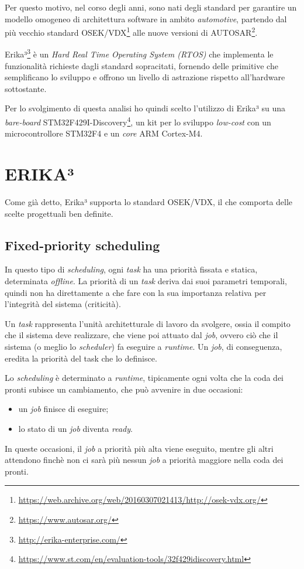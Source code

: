 \documentclass{article}
\begin{document}
Per questo motivo, nel corso degli anni, sono nati degli standard per garantire un modello omogeneo di architettura software in ambito \textit{automotive}, partendo dal più vecchio standard OSEK/VDX\footnote{\url{https://web.archive.org/web/20160307021413/http://osek-vdx.org/}} alle nuove versioni di AUTOSAR\footnote{\url{https://www.autosar.org/}}.

Erika³\footnote{\url{http://erika-enterprise.com/}} è un \textit{Hard Real Time Operating System (RTOS)} che implementa le funzionalità richieste dagli standard sopracitati, fornendo delle primitive che semplificano lo sviluppo e offrono un livello di astrazione rispetto all'hardware sottostante.

Per lo svolgimento di questa analisi ho quindi scelto l'utilizzo di Erika³ su una \textit{bare-board} STM32F429I-Discovery\footnote{\url{https://www.st.com/en/evaluation-tools/32f429idiscovery.html}}, un kit per lo sviluppo \textit{low-cost} con un microcontrollore STM32F4 e un \textit{core} ARM Cortex-M4.

\section{ERIKA³}
Come già detto, Erika³ supporta lo standard OSEK/VDX, il che comporta delle scelte progettuali ben definite.

\subsection{Fixed-priority scheduling}
In questo tipo di \textit{scheduling}, ogni \textit{task} ha una priorità fissata e statica, determinata \textit{offline}. La priorità di un \textit{task} deriva dai suoi parametri temporali, quindi non ha direttamente a che fare con la sua importanza relativa per l'integrità del sistema (criticità).

Un \textit{task} rappresenta l'unità architetturale di lavoro da svolgere, ossia il compito che il sistema deve realizzare, che viene poi attuato dal \textit{job}, ovvero ciò che il sistema (o meglio lo \textit{scheduler}) fa eseguire a \textit{runtime}. Un \textit{job}, di conseguenza, eredita la priorità del task che lo definisce.

Lo \textit{scheduling} è determinato a \textit{runtime}, tipicamente ogni volta che la coda dei pronti subisce un cambiamento, che può avvenire in due occasioni:
\begin{itemize}
	\item un \textit{job} finisce di eseguire;
	\item lo stato di un \textit{job} diventa \textit{ready}.
\end{itemize}
In queste occasioni, il \textit{job} a priorità più alta viene eseguito, mentre gli altri attendono finchè non ci sarà più nessun \textit{job} a priorità maggiore nella coda dei pronti.
\end{document}
